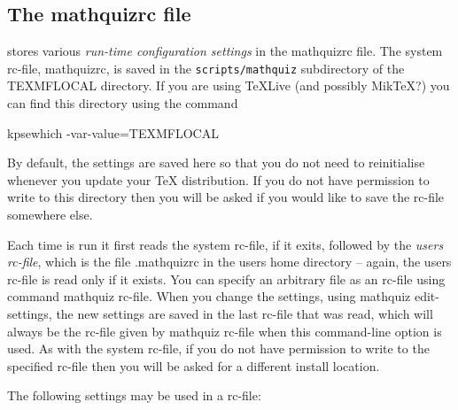\documentclass[svgnames]{article}
\newcommand\ddash{\texttt{\textemdash\textemdash}}
\newcommand\mathquizopt[1]{\textsf{mathquiz \ddash#1}}
\newcommand\mathquizrc{\index{mathquizrc}\textsf{mathquizrc}\xspace}
\begin{document}
    \subsection{The \mathquizrc file}\label{SS:customisation}\label{SS:rcfile}

    \MathQuiz stores various \textit{run-time configuration settings} in
    the \mathquizrc file. The system rc-file, \textsf{mathquizrc}, is
    saved in the \texttt{scripts/mathquiz} subdirectory of the
    \textsf{TEXMFLOCAL} directory. If you are using \TeX Live (and
    possibly Mik\TeX?) you can find this directory using the command
    \begin{center}
            \textsf{kpsewhich -var-value=TEXMFLOCAL}
    \end{center}
    By default, the \MathQuiz settings are saved here so that you do not
    need to reinitialise \MathQuiz whenever you update your \TeX{}
    distribution. If you do not have permission to write to this
    directory then you will be asked if you would like to save the
    rc-file somewhere else.

    Each time \MathQuiz is run it first reads the system rc-file, if it
    exits, followed by the \textit{users rc-file}, which is the file
    \textsf{.mathquizrc} in the users home directory -- again, the users
    rc-file is read only if it exists. You can specify an arbitrary file
    as an rc-file using command  \mathquizopt{rc-file}. When you change
    the \MathQuiz settings, using \mathquizopt{edit-settings}, the new
    settings are saved in the last rc-file that was read, which will
    always be the rc-file given by \mathquizopt{rc-file} when this
    command-line option is used.  As with the system rc-file, if you do
    not have permission to write to the specified rc-file then you will
    be asked for a different install location.

    The following settings may be used in a \MathQuiz rc-file:
\end{document}

